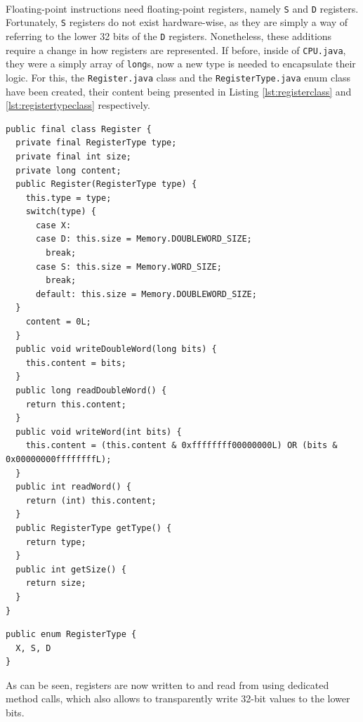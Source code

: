 \paragraph{}
Floating-point instructions need floating-point registers, namely \verb|S| and \verb|D| registers. Fortunately, \verb|S| registers do not exist hardware-wise, as they are simply a way of referring to the lower 32 bits of the \verb|D| registers. Nonetheless, these additions require a change in how registers are represented. If before, inside of \verb|CPU.java|, they were a simply array of \verb|long|s, now a new type is needed to encapsulate their logic. For this, the \verb|Register.java| class and the \verb|RegisterType.java| enum class have been created, their content being presented in Listing \ref{lst:registerclass} and \ref{lst:registertypeclass} respectively.
\begin{lstlisting}[float, caption={The register class}, label={lst:registerclass}]
public final class Register {
  private final RegisterType type;
  private final int size;
  private long content;
  public Register(RegisterType type) {
    this.type = type;
    switch(type) {
      case X:
      case D: this.size = Memory.DOUBLEWORD_SIZE;
        break;
      case S: this.size = Memory.WORD_SIZE;
        break;
      default: this.size = Memory.DOUBLEWORD_SIZE;
  }
    content = 0L;
  }
  public void writeDoubleWord(long bits) {
    this.content = bits;
  }	
  public long readDoubleWord() {
    return this.content;
  }	
  public void writeWord(int bits) {
    this.content = (this.content & 0xffffffff00000000L) OR (bits & 0x00000000ffffffffL);
  }
  public int readWord() {
    return (int) this.content;
  }
  public RegisterType getType() {
    return type;
  }
  public int getSize() {
    return size;
  }
}
\end{lstlisting}
\begin{lstlisting}[float, caption={The RegisterType class}, label={lst:registertypeclass}]
public enum RegisterType {
  X, S, D
}
\end{lstlisting}
As can be seen, registers are now written to and read from using dedicated method calls, which also allows to transparently write 32-bit values to the lower bits.
